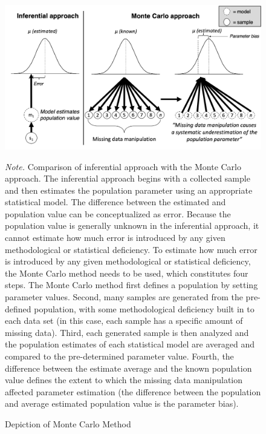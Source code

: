 \documentclass[
  english,
  man,floatsintext]{apa7}
\newcommand{\figurefootnote}{\raggedright\linespread{2}\fontfamily{phv}\fontsize{9.5pt}{11.4pt}\selectfont \textit{Note. }}
\begin{document}
\begin{figure}[H]
  \caption[Monte Carlo method]{Depiction of Monte Carlo Method}
  \label{fig:MonteCarlo-comparison}
  \includegraphics{Figures/Monte_Carlo_comparison} \hfill{}
    \figurefootnote{Comparison of inferential approach with the Monte Carlo approach. The inferential approach begins with a collected sample and then estimates the population parameter using an appropriate statistical model. The difference between the estimated and population value can be conceptualized as error. Because the population value is generally unknown in the inferential approach, it cannot estimate how much error is introduced by any given methodological or statistical deficiency. To estimate how much error is introduced by any given methodological or statistical deficiency, the Monte Carlo method needs to be used, which constitutes four steps. The Monte Carlo method first defines a population by setting parameter values. Second, many samples are generated from the pre-defined population, with some methodological deficiency built in to each data set (in this case, each sample has a specific amount of missing data). Third, each generated sample is then analyzed and the population estimates of each statistical model are averaged and compared to the pre-determined parameter value. Fourth, the difference between the estimate average and the known population value defines the extent to which the missing data manipulation affected parameter estimation (the difference between the population and average estimated population value is the parameter bias).}
\end{figure}
\end{document}
